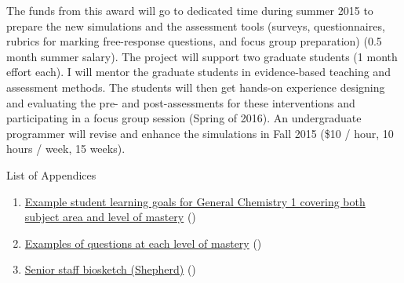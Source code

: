 \documentclass[10pt,letterpaper]{article}
\begin{document}
{

The funds from this award will go to dedicated time during summer 2015 to prepare the new simulations and the assessment tools (surveys, questionnaires, rubrics for marking free-response questions, and focus group preparation) (0.5 month summer salary). The project will support two graduate students (1 month effort each). I will mentor the graduate students in evidence-based teaching and assessment methods. The students will then get hands-on experience designing and evaluating the pre- and post-assessments for these interventions and participating in a focus group session (Spring of 2016). An undergraduate programmer will revise and enhance the simulations in Fall 2015 (\$10 / hour, 10 hours / week, 15 weeks).
}%

List of Appendices
\begin{enumerate}
\item \hyperref[app:learning_objectives]{Example student learning goals for General Chemistry 1 covering both subject area and level of mastery} ()
\item \hyperref[app:example_questions]{Examples of questions at each level of mastery} ()
\item \hyperref[app:shepherd_biosketch]{Senior staff biosketch (Shepherd)} ()
\end{enumerate}

\newpage
\raggedright\footnotesize\singlespacing
\renewcommand{\refname}{\large\textbf{References}}


% 

% 

\newpage
{}\label{app:learning_objectives}

\newpage
{}\label{app:example_questions}

\newpage
{}\label{app:shepherd_biosketch}
\end{document}
